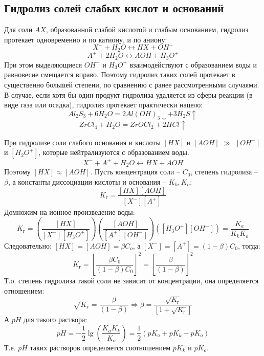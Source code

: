 \documentclass[14pt,a4paper]{scrartcl}
\begin{document}
\subsection*{Гидролиз солей слабых кислот и оснований}
Для соли $AX$, образованной слабой кислотой и слабым основанием, гидролиз протекает одновременно и по катиону, и по аниону:
$$ X^- + H_2O \leftrightarrow HX + OH^- $$
$$ A^+ + 2H_2O \leftrightarrow AOH + H_3O^+ $$
При этом выделяющиеся $OH^-$ и $H_3O^+$ взаимодействуют с образованием воды и равновесие смещается вправо. Поэтому гидролиз таких солей протекает в существенно большей степени, по сравнению с ранее рассмотренными случаями. В случае, если хотя бы один продукт гидролиза удаляется из сферы реакции (в виде газа или осадка), гидролиз протекает практически нацело:
$$ Al_2S_3 + 6H_2O = 2Al(OH)_3 \downarrow + 3H_2S \uparrow $$
$$ ZrCl_4 + H_2O = ZrOCl_2 + 2HCl \uparrow $$

При гидролизе соли слабого основания и кислоты  $[HX]$ и $[AOH]$ $\gg$ $[OH^-] $ и $[H_2O^+] $, которые нейтрализуются с образованием воды.
$$ X^- + A^+ + H_2O \leftrightarrow HX + AOH $$
Поэтому $[HX] \approx [AOH]$. Пусть концентрация соли -- $C_0$, степень гидролиза -- $\beta$, а константы диссоциации кислоты и основания --  $K_k, K_o $:
$$ K_{\text{г}} = \dfrac{[HX][AOH]}{[X^-][A^+]} $$
Домножим на ионное произведение воды:
$$ K_{\text{г}} = \left(\dfrac{[HX]}{[X^-][H_3O^+]}  \right) \left(\dfrac{[AOH]}{[A^+][OH^-]}  \right) \left([H_3O^+][OH^-]\right) = \dfrac{K_a}{K_kK_o} $$
Следовательно:
$ [HX] = [AOH] = \beta C_o $, а $ [X^-]=[A^+] = (1-\beta)C_0 $, тогда:
$$ K_{\text{г}} = \left[\dfrac{\beta C_0}{(1-\beta)C_0}\right]^2 = \left[\dfrac{\beta}{(1-\beta)}\right]^2  $$
Т.о. степень гидролиза такой соли не зависит от концентрации, она определяется отношением:
$$ \sqrt{K_{\text{г}}} = \dfrac{\beta}{(1-\beta)} \Rightarrow \beta = \dfrac{\sqrt{K_{\text{г}}}}{[1+\sqrt{K_{\text{г}}}]}   $$
А $pH$ для такого раствора:
$$ pH = -\dfrac{1}{2} \lg{\left(\dfrac{K_aK_k}{K_o} \right)} = \dfrac{1}{2}(pK_a + pK_k - pK_o) $$
Т.е. $pH$ таких растворов определяется соотношением $pK_k $ и $pK_o $.
\end{document}

